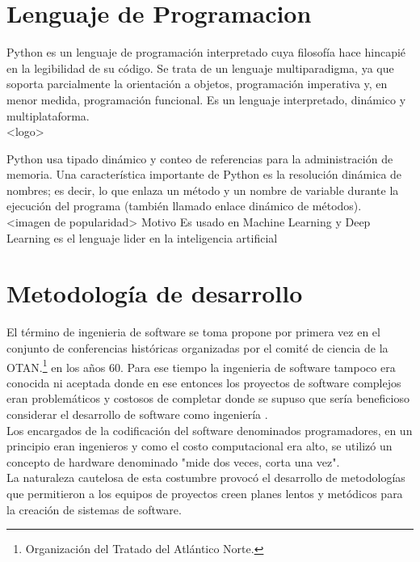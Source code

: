 \section{Lenguaje de Programacion}
Python es un lenguaje de programación interpretado cuya filosofía hace hincapié en la legibilidad de su código. Se trata de un lenguaje multiparadigma, ya que soporta parcialmente la orientación a objetos, programación imperativa y, en menor medida, programación funcional. Es un lenguaje interpretado, dinámico y multiplataforma.\\

<logo>

Python usa tipado dinámico y conteo de referencias para la administración de memoria. Una característica importante de Python es la resolución dinámica de nombres; es decir, lo que enlaza un método y un nombre de variable durante la ejecución del programa (también llamado enlace dinámico de métodos).\\

<imagen de popularidad>
Motivo
Es usado en Machine Learning y Deep Learning es el lenguaje lider en la inteligencia artificial

\section{Metodología de desarrollo}
El término de ingenieria de software se toma propone por primera vez en el conjunto de conferencias históricas organizadas por el comité de ciencia de la OTAN.\footnote{Organización del Tratado del Atlántico Norte.} en los años 60. Para ese tiempo la ingenieria de software tampoco era conocida ni aceptada donde en ese entonces los proyectos de software complejos eran problemáticos y costosos de completar donde se supuso que sería beneficioso considerar el desarrollo de software como ingeniería \cite{Ganis}.\\

Los encargados de la codificación del software denominados programadores, en un principio eran ingenieros y como el costo computacional era alto, se utilizó un concepto de hardware denominado "mide dos veces, corta una vez"\cite{Ganis}.\\
La naturaleza cautelosa de esta costumbre provocó el desarrollo de metodologías que permitieron a los equipos de proyectos creen planes lentos y metódicos para la creación de sistemas de software.\\

